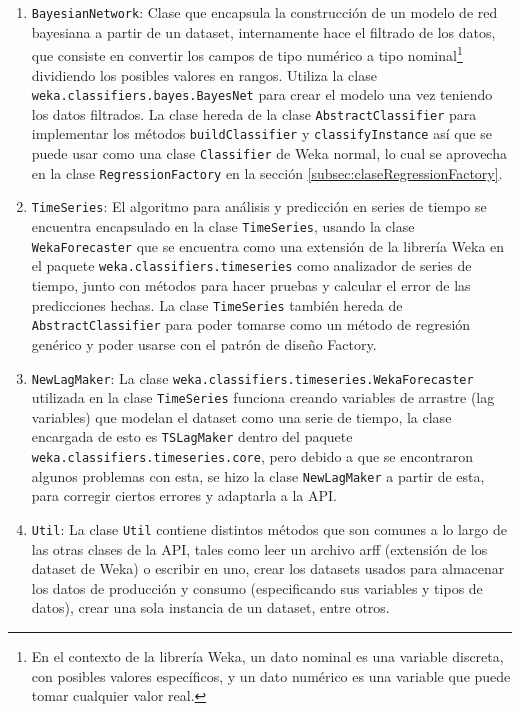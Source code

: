 \renewcommand{\labelenumi}{$\bullet$ }
\begin{enumerate}
	\item \texttt{BayesianNetwork}: Clase que encapsula la construcción de un modelo de red bayesiana a partir de un dataset, internamente hace el filtrado de los datos, que consiste en convertir los campos de tipo numérico a tipo nominal\footnote{En el contexto de la librería Weka, un dato nominal es una variable discreta, con posibles valores específicos, y un dato numérico es una variable que puede tomar cualquier valor real.} dividiendo los posibles valores en rangos. Utiliza la clase \texttt{weka.classifiers.bayes.BayesNet} para crear el modelo una vez teniendo los datos filtrados. La clase hereda de la clase \texttt{AbstractClassifier} para implementar los métodos \texttt{buildClassifier} y \texttt{classifyInstance} así que se puede usar como una clase \texttt{Classifier} de Weka normal, lo cual se aprovecha en la clase \texttt{RegressionFactory} en la sección \ref{subsec:claseRegressionFactory}.
	
	\item \texttt{TimeSeries}: El algoritmo para análisis y predicción en series de tiempo se encuentra encapsulado en la clase \texttt{TimeSeries}, usando la clase \texttt{WekaForecaster} que se encuentra como una extensión de la librería Weka en el paquete \texttt{weka.classifiers.timeseries} como analizador de series de tiempo, junto con métodos para hacer pruebas y calcular el error de las predicciones hechas. La clase \texttt{TimeSeries} también hereda de \texttt{AbstractClassifier} para poder tomarse como un método de regresión genérico y poder usarse con el patrón de diseño Factory. %
	
	\item \texttt{NewLagMaker}: La clase \texttt{weka.classifiers.timeseries.WekaForecaster} utilizada en la clase \texttt{TimeSeries} funciona creando variables de arrastre (lag variables) que modelan el dataset como una serie de tiempo, la clase encargada de esto es \texttt{TSLagMaker} dentro del paquete \texttt{weka.classifiers.timeseries.core}, pero debido a que se encontraron algunos problemas con esta, se hizo la clase \texttt{NewLagMaker} a partir de esta, para corregir ciertos errores y adaptarla a la API.
	
	\item \texttt{Util}: La clase \texttt{Util} contiene distintos métodos que son comunes a lo largo de las otras clases de la API, tales como leer un archivo arff (extensión de los dataset de Weka) o escribir en uno, crear los datasets usados para almacenar los datos de producción y consumo (especificando sus variables y tipos de datos), crear una sola instancia de un dataset, entre otros.
	

\end{enumerate}
